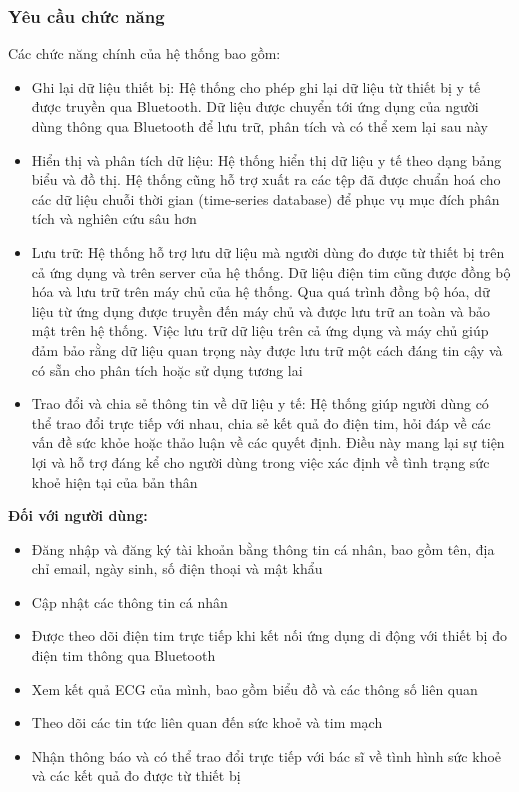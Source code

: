 \subsubsection{Yêu cầu chức năng}
Các chức năng chính của hệ thống bao gồm:
\begin{adjustwidth}{1.5em}{}
  \begin{itemize}
      \item Ghi lại dữ liệu thiết bị: Hệ thống cho phép ghi lại dữ liệu từ thiết bị y tế được truyền qua Bluetooth. Dữ liệu được chuyển tới ứng dụng của người dùng thông qua Bluetooth để lưu trữ, phân tích và có thể xem lại sau này
      \item Hiển thị và phân tích dữ liệu: Hệ thống hiển thị dữ liệu y tế theo dạng bảng biểu và đồ thị. Hệ thống cũng hỗ trợ xuất ra các tệp đã được chuẩn hoá cho các dữ liệu chuỗi thời gian (time-series database) để phục vụ mục đích phân tích và nghiên cứu sâu hơn
      \item Lưu trữ: Hệ thống hỗ trợ lưu dữ liệu mà người dùng đo được từ thiết bị trên cả ứng dụng và trên server của hệ thống. Dữ liệu điện tim cũng được đồng bộ hóa và lưu trữ trên máy chủ của hệ thống. Qua quá trình đồng bộ hóa, dữ liệu từ ứng dụng được truyền đến máy chủ và được lưu trữ an toàn và bảo mật trên hệ thống. Việc lưu trữ dữ liệu trên cả ứng dụng và máy chủ giúp đảm bảo rằng dữ liệu quan trọng này được lưu trữ một cách đáng tin cậy và có sẵn cho phân tích hoặc sử dụng tương lai
      \item Trao đổi và chia sẻ thông tin về dữ liệu y tế: Hệ thống giúp người dùng có thể trao đổi trực tiếp với nhau, chia sẻ kết quả đo điện tim, hỏi đáp về các vấn đề sức khỏe hoặc thảo luận về các quyết định. Điều này mang lại sự tiện lợi và hỗ trợ đáng kể cho người dùng trong việc xác định về tình trạng sức khoẻ hiện tại của bản thân
  \end{itemize}
\end{adjustwidth}
\textbf{Đối với người dùng:}
\begin{adjustwidth}{1.5em}{}
\begin{itemize}
    \item Đăng nhập và đăng ký tài khoản bằng thông tin cá nhân, bao gồm tên, địa chỉ email, ngày sinh, số điện thoại và mật khẩu
    \item Cập nhật các thông tin cá nhân
    \item Được theo dõi điện tim trực tiếp khi kết nối ứng dụng di động với thiết bị đo điện tim thông qua Bluetooth
    \item Xem kết quả ECG của mình, bao gồm biểu đồ và các thông số liên quan
    \item Theo dõi các tin tức liên quan đến sức khoẻ và tim mạch
    \item Nhận thông báo và có thể trao đổi trực tiếp với bác sĩ về tình hình sức khoẻ và các kết quả đo được từ thiết bị
\end{itemize}
\end{adjustwidth}
